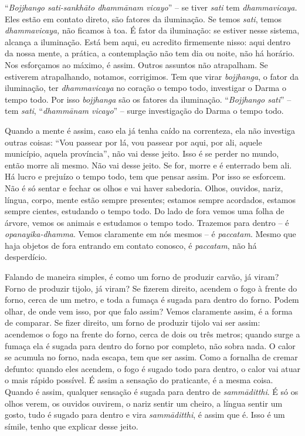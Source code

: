 “\textit{Bojjhango sati-sankhāto dhammānam vicayo}” – se tiver
\textit{sati} tem \textit{dhammavicaya.} Eles estão em contato direto,
são fatores da iluminação. Se temos \textit{sati}, temos
\textit{dhammavicaya,} não ficamos à toa. É fator da iluminação: se
estiver nesse sistema, alcança a iluminação. Está bem aqui, eu acredito
firmemente nisso: aqui dentro da nossa mente, a prática, a contemplação
não tem dia ou noite, não há horário. Nos esforçamos ao máximo, é
assim. Outros assuntos não atrapalham. Se estiverem atrapalhando,
notamos, corrigimos. Tem que virar \textit{bojjhanga}, o fator da
iluminação, ter \textit{dhammavicaya} no coração o tempo todo,
investigar o Darma o tempo todo. Por isso \textit{bojjhanga} são os
fatores da iluminação. “\textit{Bojjhango sati}” – tem \textit{sati},
“\textit{dhammānam vicayo}” – surge investigação do Darma o tempo
todo. 

Quando a mente é assim, caso ela já tenha caído na correnteza, ela
não investiga outras coisas: “Vou passear por lá, vou passear por aqui,
por ali, aquele município, aquela província”, não vai desse jeito. Isso
é se perder no mundo, então morre ali mesmo. Não vai desse jeito. Se
for, morre e é enterrado bem ali. Há lucro e prejuízo o tempo todo, tem
que pensar assim. Por isso se esforcem. Não é só sentar e fechar os
olhos e vai haver sabedoria. Olhos, ouvidos, nariz, língua, corpo,
mente estão sempre presentes; estamos sempre acordados, estamos sempre
cientes, estudando o tempo todo. Do lado de fora vemos uma folha de
árvore, vemos os animais e estudamos o tempo todo. Trazemos para dentro
– é \textit{opanayika-dhamma}. Vemos claramente em nós mesmos – é
\textit{paccatam}. Mesmo que haja objetos de fora entrando em contato
conosco, é \textit{paccatam}, não há desperdício. 

Falando de maneira simples, é como um forno de produzir carvão, já
viram? Forno de produzir tijolo, já viram? Se fizerem direito, acendem
o fogo à frente do forno, cerca de um metro, e toda a fumaça é sugada
para dentro do forno. Podem olhar, de onde vem isso, por que falo
assim? Vemos claramente assim, é a forma de comparar. Se fizer direito,
um forno de produzir tijolo vai ser assim: acendemos o fogo na frente
do forno, cerca de dois ou três metros; quando surge a fumaça ela é
sugada para dentro do forno por completo, não sobra nada. O calor se
acumula no forno, nada escapa, tem que ser assim. Como a fornalha de
cremar defunto: quando eles acendem, o fogo é sugado todo para dentro,
o calor vai atuar o mais rápido possível. É assim a sensação do
praticante, é a mesma coisa. Quando é assim, qualquer sensação é sugada
para dentro de \textit{sammāditthi}. É só os olhos verem, os ouvidos
ouvirem, o nariz sentir um cheiro, a língua sentir um gosto, tudo é
sugado para dentro e vira \textit{sammāditthi}, é assim que é. Isso é
um símile, tenho que explicar desse jeito.

